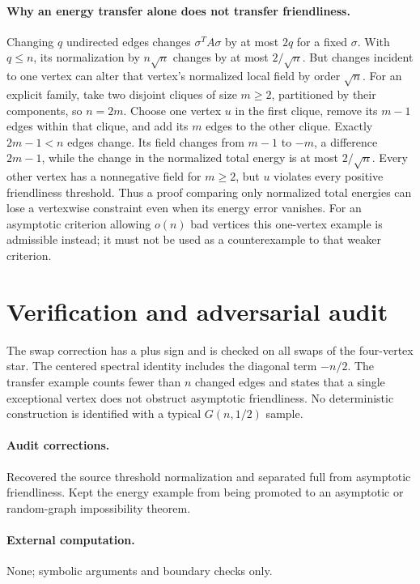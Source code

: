 \documentclass[11pt]{article}
\begin{document}
\paragraph{Why an energy transfer alone does not transfer friendliness.}
Changing $q$ undirected edges changes $\sigma^TA\sigma$ by at most $2q$
for a fixed $\sigma$. With $q\leq n$, its normalization by $n\sqrt n$
changes by at most $2/\sqrt n$. But changes incident to one vertex can alter
that vertex's normalized local field by order $\sqrt n$.
For an explicit family, take two disjoint cliques of size $m\geq2$, partitioned
by their components, so $n=2m$. Choose one vertex $u$ in the first clique,
remove its $m-1$ edges within that clique, and add its $m$ edges to the
other clique. Exactly $2m-1<n$ edges change. Its field changes from
$m-1$ to $-m$, a difference $2m-1$, while the change in the normalized total
energy is at most $2/\sqrt n$. Every other vertex has a nonnegative field
for $m\geq2$, but $u$ violates every positive friendliness threshold.
Thus a proof comparing only normalized total energies can lose a vertexwise
constraint even when its energy error vanishes. For an asymptotic criterion
allowing $o(n)$ bad vertices this one-vertex example is admissible instead;
it must not be used as a counterexample to that weaker criterion.

\section{Verification and adversarial audit}

The swap correction has a plus sign and is checked on all swaps of the
four-vertex star. The centered spectral identity includes the diagonal term
$-n/2$. The transfer example counts fewer than $n$ changed edges and states
that a single exceptional vertex does not obstruct asymptotic friendliness.
No deterministic construction is identified with a typical $G(n,1/2)$ sample.

\paragraph{Audit corrections.} Recovered the source threshold normalization and separated full from
asymptotic friendliness. Kept the energy example from being promoted to an
asymptotic or random-graph impossibility theorem.
\paragraph{External computation.} None; symbolic arguments and boundary checks only.
\end{document}
